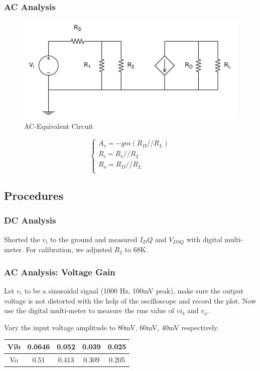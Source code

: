     \subsubsection{AC Analysis}
        \begin{figure}[h]
            \centering
            \includegraphics[width=0.5\linewidth]{Lab09/L9AC.drawio.png}
            \caption{AC-Equivalent Circuit}
            \label{l9ac}
        \end{figure}
        \FloatBarrier
        \begin{equation*}
            \begin{cases}
                A_v=-gm(R_D//R_L)\\
                R_i=R_1//R_2\\
                R_o=R_D//R_L\\
            \end{cases}
        \end{equation*}

        
    \subsection{Procedures}
    \subsubsection{DC Analysis}
    Shorted the $v_i$ to the ground and measured $I_DQ$ and $V_{DSQ}$ with digital multi-meter. For calibration, we adjusted $R_2$ to 68K.

    \subsubsection{AC Analysis: Voltage Gain}
    Let $v_i$ to be a sinusoidal signal (1000 Hz, 100mV peak), make sure the output voltage is not distorted with the help of the oscilloscope and record the plot. Now use the digital multi-meter to measure the rms value of $vi_b$ and $v_o$.\par
    Vary the input voltage amplitude to 80mV, 60mV, 40mV respectively.\\
    \begin{table}[h]
    \centering
    \begin{tabular}{|c|c|c|c|c|}
    \hline
    Vib & 0.0646 & 0.052 & 0.039 & 0.025 \\ \hline
    Vo  & 0.51   & 0.413 & 0.309 & 0.205 \\ \hline
    \end{tabular}
    \end{table}
    
